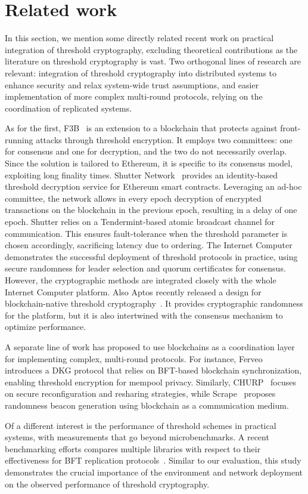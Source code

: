 \section{Related work}
\label{sec:relwork}
In this section, we mention some directly related recent work on practical integration of threshold cryptography, excluding theoretical contributions as the literature on threshold cryptography is vast.
Two orthogonal lines of research are relevant: integration of threshold cryptography into distributed systems to enhance security and relax system-wide trust assumptions, and easier implementation of more complex multi-round protocols, relying on the coordination of replicated systems. 

As for the first, 
F3B~\cite{DBLP:conf/aft/ZhangMQBEF23} is an extension to a blockchain that protects against front-running attacks through threshold encryption.  It employs two committees: one for consensus and one for decryption, and the two do not necessarily overlap.  Since the solution is tailored to Ethereum, it is specific to its consensus model, exploiting long finality times. 
Shutter Network~\cite{shutter} provides an identity-based threshold decryption service for Ethereum smart contracts. Leveraging an ad-hoc committee, the network allows in every epoch decryption of encrypted transactions on the blockchain in the previous epoch, resulting in a delay of one epoch. Shutter relies on a Tendermint-based atomic broadcast channel for communication. This ensures fault-tolerance when the threshold parameter is chosen accordingly, sacrificing latency due to ordering.
The Internet Computer~\cite{DBLP:conf/podc/CamenischDHPS022} demonstrates the successful deployment of threshold protocols in practice, using secure randomness for leader selection and quorum certificates for consensus. However, the cryptographic methods are integrated closely with the whole Internet Computer platform.
Also Aptos recently released a design for blockchain-native threshold cryptography~\cite{DBLP:journals/corr/abs-2407-12172}.  It provides cryptographic randomness for the platform, but it is also intertwined with the consensus mechanism to optimize performance.

A separate line of work has proposed to use blockchains as a coordination layer for implementing complex, multi-round protocols. For instance, Ferveo~\cite{DBLP:journals/iacr/BebelO22} introduces a DKG protocol that relies on BFT-based blockchain synchronization, enabling threshold encryption for mempool privacy. Similarly, CHURP~\cite{DBLP:conf/ccs/MaramZWLZJS19} focuses on secure reconfiguration and resharing strategies, while Scrape~\cite{DBLP:conf/acns/CascudoD17} proposes randomness beacon generation using blockchain as a communication medium.

Of a different interest is the performance of threshold schemes in practical systems, with measurements that go beyond microbenchmarks. A recent benchmarking efforts compares multiple libraries with respect to their effectiveness for BFT replication protocols~\cite{vonseck2024thresh}. 
Similar to our evaluation, this study demonstrates the crucial importance of the environment and network deployment on the observed performance of threshold cryptography.